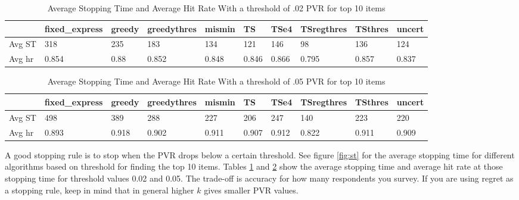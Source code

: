 \documentclass[nonblindrev]{informs3}
\begin{document}
\begin{table}
\begin{center}
\begin{tabular}{llllllllll}
\hline    &  fixed\_express &  greedy &  greedythres &  mismin &    TS &  TSe4 &  TSregthres &  TSthres &  uncert \\\hline  Avg ST  & 318 &   235 & 183 & 134 & 121 & 146 & 	98 &	136 &   124 \\  Avg hr  &  0.854 &  0.88 & 0.852&0.848 & 0.846 & 	0.866 & 0.795 &0.857 &  0.837 \end{tabular}
\end{center}
\caption{Average Stopping Time and Average Hit Rate With a threshold of .02 PVR for top 10 items}
\label{table:st2}
\end{table}
\begin{table}
\begin{center}
\begin{tabular}{llllllllll}
\hline    &  fixed\_express &  greedy &  greedythres &  mismin &    TS &  TSe4 &  TSregthres &  TSthres &  uncert \\\hline    Avg ST & 498 & 389 & 288 & 227 & 206 & 247 & 140 &223 &  220 \\ Avg hr & 0.893 &0.918&0.902& 	0.911 & 0.907& 0.912 & 0.822&0.911& 0.909\end{tabular}
\end{center}
\caption{Average Stopping Time and Average Hit Rate With a threshold of .05 PVR for top 10 items}
\label{table:st5}
\end{table}
A good stopping rule is to stop when the PVR drops below a certain threshold. See figure \ref{fig:st} for the average stopping time for different algorithms based on threshold for finding the top 10 items. Tables \ref{table:st2} and \ref{table:st5} show the average stopping time and average hit rate at those stopping time for threshold values 0.02 and 0.05. The trade-off is accuracy for how many respondents you survey. If you are using regret as a stopping rule, keep in mind that in general higher $k$ gives smaller PVR values.\\ 
\end{document}
